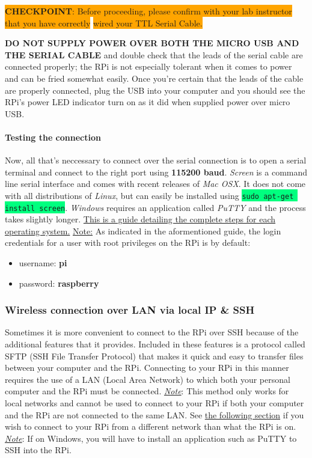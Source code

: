 \documentclass{article}
\newcommand{\codei}[1]{\colorbox{SpringGreen}{\texttt{#1}}} %
\newcommand{\checkpoint}[2]{
    \newline \newline
    \noindent
    \colorbox{Orange}{\textbf{CHECKPOINT}: #1} \newline \colorbox{Orange}{#2}
    \newline \newline
}
\begin{document}
    \checkpoint{Before proceeding, please confirm with your lab instructor that you have correctly}{wired your TTL Serial Cable.}

    \textbf{DO NOT SUPPLY POWER OVER BOTH THE MICRO USB AND THE SERIAL CABLE} and double check that the leads of the serial cable are connected properly; the RPi is not especially tolerant when it comes to power and can be fried somewhat easily. Once you're certain that the leads of the cable are properly connected, plug the USB into your computer and you should see the RPi's power LED indicator turn on as it did when supplied power over micro USB.

    \paragraph{Testing the connection}
    Now, all that's neccessary to connect over the serial connection is to open a serial terminal and connect to the right port using \textbf{115200 baud}. \textit{Screen} is a command line serial interface and comes with recent releases of \textit{Mac OSX}. It does not come with all distributions of \textit{Linux}, but can easily be installed using \codei{sudo apt-get install screen}. \textit{Windows} requires an application called \textit{PuTTY} and the process takes slightly longer. \href{https://learn.adafruit.com/adafruits-raspberry-pi-lesson-5-using-a-console-cable/test-and-configure}{This is a guide detailing the complete steps for each operating system.}
    \newline\newline
    \underline{Note:} As indicated in the aformentioned guide, the login credentials for a user with root privileges on the RPi is by default:
    \begin{itemize}
      \item username: \textbf{pi}
      \item password: \textbf{raspberry}
    \end{itemize}
    \subsubsection{Wireless connection over LAN via local IP \& SSH}
    \label{sec:connect-ssh}
    Sometimes it is more convenient to connect to the RPi over SSH because of the additional features that it provides. Included in these features is a protocol called SFTP (SSH File Transfer Protocol) that makes it quick and easy to transfer files between your computer and the RPi. Connecting to your RPi in this manner requires the use of a LAN (Local Area Network) to which both your personal computer and the RPi must be connected.
    \newline
    \newline
    \underline{\textit{Note}}: This method only works for local networks and cannot be used to connect to your RPi if both your computer and the RPi are not connected to the same LAN. See \hyperref[sec:connect-sshwan]{the following section} if you wish to connect to your RPi from a different network than what the RPi is on.
    \underline{\textit{Note}}: If on Windows, you will have to install an application such as PuTTY to SSH into the RPi.
\end{document}
